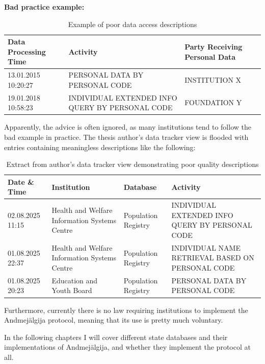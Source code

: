 \textbf{Bad practice example:}

\begin{table}[h]
\centering
\begin{tabular}{|p{3cm}|p{6cm}|p{4cm}|}
\hline
\textbf{Data Processing Time} & \textbf{Activity} & \textbf{Party Receiving Personal Data} \\
\hline
13.01.2015 10:20:27 & PERSONAL DATA BY PERSONAL CODE & INSTITUTION X \\
\hline
19.01.2018 10:58:23 & INDIVIDUAL EXTENDED INFO QUERY BY PERSONAL CODE & FOUNDATION Y \\
\hline
\end{tabular}
\caption{Example of poor data access descriptions}
\end{table}

Apparently, the advice is often ignored, as many institutions tend to follow the bad example in practice. The thesis author's data tracker view is flooded with entries containing meaningless descriptions like the following:

\begin{table}[H]
\centering
\begin{tabular}{|p{2.5cm}|p{5cm}|p{3cm}|p{3.5cm}|}
\hline
\textbf{Date \& Time} & \textbf{Institution} & \textbf{Database} & \textbf{Activity} \\
\hline
02.08.2025 11:15 & Health and Welfare Information Systems Centre & Population Registry & INDIVIDUAL EXTENDED INFO QUERY BY PERSONAL CODE \\
\hline
01.08.2025 22:37 & Health and Welfare Information Systems Centre & Population Registry & INDIVIDUAL NAME RETRIEVAL BASED ON PERSONAL CODE \\
\hline
01.08.2025 20:23 & Education and Youth Board & Population Registry & PERSONAL DATA BY PERSONAL CODE \\
\hline
\end{tabular}
\caption{Extract from author's data tracker view demonstrating poor quality descriptions}
\end{table}

Furthermore, currently there is no law requiring institutions to implement the Andmejälgija protocol, meaning that its use is pretty much voluntary.

In the following chapters I will cover different state databases and their implementations of Andmejälgija, and whether they implement the protocol at all.